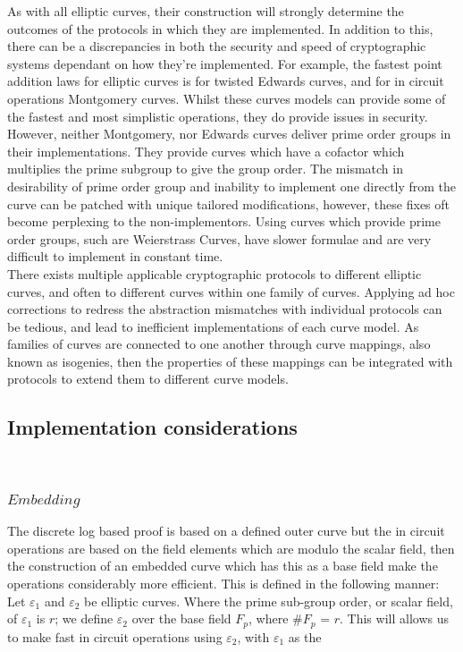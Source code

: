\documentclass{article}
\begin{document}
As with all elliptic curves, their construction will strongly determine the outcomes of the protocols in which they are implemented. In addition to this, there can be a discrepancies in both the security and speed of cryptographic systems dependant on how they're implemented. For example, the fastest point addition laws for elliptic curves is for twisted Edwards curves, and for in circuit operations Montgomery curves. Whilst these curves models can provide some of the fastest and most simplistic operations, they do provide issues in security. However, neither Montgomery, nor Edwards curves deliver prime order groups in their implementations. They provide curves which have a cofactor which multiplies the prime subgroup to give the group order. The mismatch in desirability of prime order group and inability to implement one directly from the curve can be patched with unique tailored modifications, however, these fixes oft become perplexing to the non-implementors. Using curves which provide prime order groups, such are Weierstrass Curves, have slower formulae and are very difficult to implement in constant time. \\ 

There exists multiple applicable cryptographic protocols to different elliptic curves, and often to different curves within one family of curves. Applying ad hoc corrections to redress the abstraction mismatches with individual protocols can be tedious, and lead to inefficient implementations of each curve model. As families of curves are connected to one another through curve mappings, also known as isogenies, then the properties of these mappings can be integrated with protocols to extend them to different curve models.




\subsection{Implementation considerations}
\\ \subsubsection{$Embedding$}
The discrete log based proof is based on a defined outer curve but the in circuit operations are based on the field elements which are modulo the scalar field, then the construction of an embedded curve which has this as a base field make the operations considerably more efficient. This is defined in the following manner: Let $\varepsilon_{1}$ and $\varepsilon_{2}$ be elliptic curves. Where the prime sub-group order, or scalar field, of $\varepsilon_{1}$ is $r$; we define $\varepsilon_{2}$ over the base field $F_p$, where \#$F_p$ = $r$.
This will allows us to make fast in circuit operations using $\varepsilon_{2}$, with  $\varepsilon_{1}$ as the 
\end{document}
